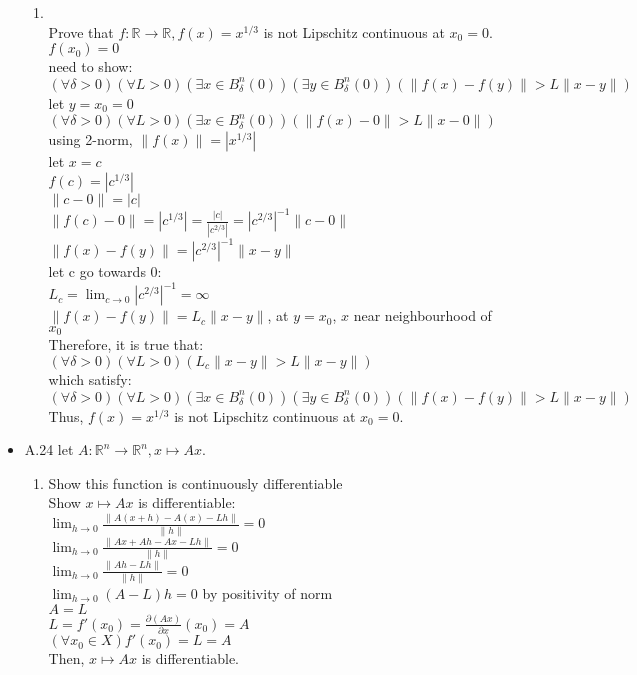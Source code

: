 \documentclass[12pt,letter]{article}
\newcommand{\R}{\mathbb{R}}
\begin{document}
\begin{itemize}
\begin{enumerate}
  \item\\
    Prove that $f: \R\rightarrow \R, f(x)=x^{1/3}$ is not Lipschitz continuous at $x_0=0$.\\
    $f(x_0)=0$\\
    need to show:\\
    $(\forall \delta>0)(\forall L>0)(\exists x \in B_{\delta}^n(0))(\exists y \in B_{\delta}^n(0))(\|f(x)-f(y)\| > L \|x-y\|)$\\
    let $y=x_0=0$\\
    $(\forall \delta>0)(\forall L>0)(\exists x \in B_{\delta}^n(0))(\|f(x)-0\| > L \|x-0\|)$\\
    using 2-norm, $\|f(x)\| = |x^{1/3}|$\\
    let $x=c$\\
    $f(c)=|c^{1/3}|$\\
    $\|c-0\|=|c|$\\
    $\|f(c)-0\|=|c^{1/3}|=\frac{|c|}{|c^{2/3}|}=|c^{2/3}|^{-1}\|c-0\|$\\
    $\|f(x)-f(y)\|=|c^{2/3}|^{-1}\|x-y\|$\\
    let c go towards 0:\\
    $L_c=\lim_{c\to 0}|c^{2/3}|^{-1}=\infty$\\
    $\|f(x)-f(y)\|=L_c\|x-y\|$, at $y=x_0$, $x$ near neighbourhood of $x_0$\\
    Therefore, it is true that:\\
    $(\forall \delta>0)(\forall L>0)( L_c\|x-y\| > L \|x-y\|)$\\
    which satisfy:\\
    $(\forall \delta>0)(\forall L>0)(\exists x \in B_{\delta}^n(0))(\exists y \in B_{\delta}^n(0))(\|f(x)-f(y)\| > L \|x-y\|)$\\
    Thus, $f(x)=x^{1/3}$ is not Lipschitz continuous at $x_0=0$.
  \end{enumerate}

  \pagebreak

\item A.24
  let $A: \R^n\rightarrow\R^n, x \mapsto Ax$.\\
  \begin{enumerate}
  \item
    Show this function is continuously differentiable\\
    
    Show $x\mapsto Ax$ is differentiable:\\
    $\lim_{h \to 0} \frac{\|A(x+h)-A(x)-Lh\|}{\|h\|}=0$\\
    $\lim_{h \to 0} \frac{\|Ax+Ah-Ax-Lh\|}{\|h\|}=0$\\
    $\lim_{h \to 0} \frac{\|Ah-Lh\|}{\|h\|}=0$\\
    $\lim_{h \to 0} (A-L)h=0$ by positivity of norm\\
    $A=L$\\
    $L=f'(x_0)=\frac{\partial (Ax)}{\partial x}(x_0)=A$\\
    $(\forall x_0 \in X)f'(x_0)=L=A$\\
    Then, $x \mapsto Ax$ is differentiable.\\


\end{enumerate}
\end{itemize}
\end{document}
